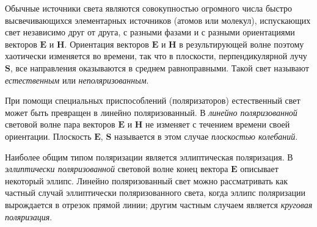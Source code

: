 \documentclass[a4paper,12pt]{article}
\begin{document}
Обычные источники света являются совокупностью огромного числа быстро высвечивающихся элементарных источников (атомов или молекул), испускающих свет независимо друг от друга, с разными фазами и с разными ориентациями векторов $\mathbf{E}$ и $\mathbf{H}$. Ориентация векторов $\mathbf{E}$ и $\mathbf{H}$ в результирующей волне поэтому хаотически изменяется во времени, так что в плоскости, перпендикулярной лучу $\mathbf{S}$, все направления оказываются в среднем равноправными. Такой свет называют \textit{естественным} или \textit{неполяризованным}.

При помощи специальных приспособлений (поляризаторов) естественный свет может быть превращен в линейно поляризованный. В \textit{линейно поляризованной} световой волне пара векторов $\mathbf{E}$ и $\mathbf{H}$ не изменяет с течением времени своей ориентации. Плоскость $\mathbf{E}$, $\mathbf{S}$ называется в этом случае \textit{плоскостью колебаний}.

Наиболее общим типом поляризации является эллиптическая поляризация. В \textit{эллиптически поляризованной} световой волне конец вектора $\mathbf{E}$ описывает некоторый эллипс. Линейно поляризованный свет можно рассматривать как частный случай эллиптически поляризованного света, когда эллипс поляризации вырождается в отрезок прямой линии; другим частным случаем является \textit{круговая
поляризация}.
\end{document}
